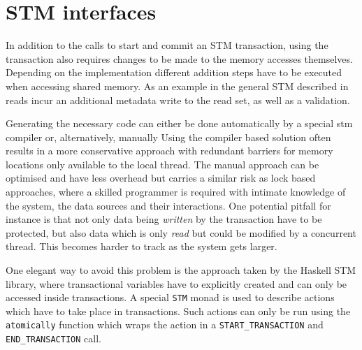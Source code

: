 \section{STM interfaces}

\label{sec:stm-interfaces}

In addition to the calls to start and commit an STM transaction, using the
transaction also requires changes to be made to the memory accesses themselves.
Depending on the implementation different addition steps have to be executed
when accessing shared memory. As an example in the general STM described in
\cite{stm-research-toy} reads incur an additional metadata write to the read
set, as well as a validation.

Generating the necessary code can either be done automatically by a special stm
compiler or, alternatively, manually Using the compiler based solution often
results in a more conservative approach with redundant barriers for memory
locations only available to the local thread. The manual approach can be
optimised and have less overhead but carries a similar risk as lock based
approaches, where a skilled programmer is required with intimate knowledge of
the system, the data sources and their interactions. One potential pitfall for
instance is that not only data being \emph{written} by the transaction have to
be protected, but also data which is only \emph{read} but could be modified by a
concurrent thread. This becomes harder to track as the system gets larger.

One elegant way to avoid this problem is the approach taken by the Haskell STM
library, where transactional variables have to explicitly created and can only
be accessed inside transactions. A special \texttt{STM} monad is used to
describe actions which have to take place in transactions. Such actions can only
be run using the \texttt{atomically} function which wraps the action in a
\texttt{START_TRANSACTION} and \texttt{END_TRANSACTION} call.
